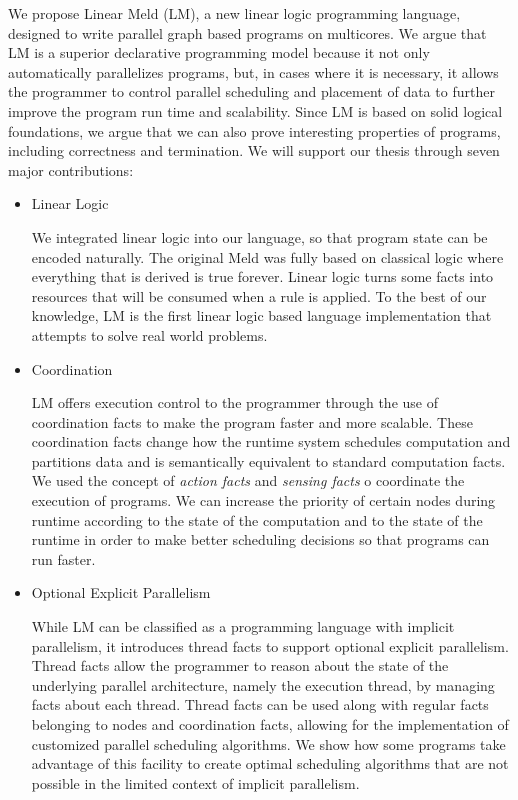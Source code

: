 
We propose Linear Meld (LM), a new linear logic programming language, designed
to write parallel graph based programs on multicores.  We argue that LM is a
superior declarative programming model because it not only automatically
parallelizes programs, but, in cases where it is necessary, it allows the
programmer to control parallel scheduling and placement of data to further
improve the program run time and scalability.  Since LM is based on solid
logical foundations, we argue that we can also prove interesting properties of
programs, including correctness and termination. We will support our thesis
through seven major contributions:

\begin{itemize}
   
   \item Linear Logic

   We integrated linear logic into our language, so that program state can be
   encoded naturally. The original Meld was fully based on classical logic where
   everything that is derived is true forever. Linear logic turns some facts
   into resources that will be consumed when a rule is applied.  To the best of
   our knowledge, LM is the first linear logic based language implementation
   that attempts to solve real world problems.


   \item Coordination
   
   LM offers execution control to the programmer through the use of coordination
   facts to make the program faster and more scalable. These coordination facts
   change how the runtime system schedules computation and partitions data and
   is semantically equivalent to standard computation facts.  We used the
   concept of \emph{action facts} and \emph{sensing facts} o coordinate the
   execution of programs.  We can increase the priority of certain nodes during
   runtime according to the state of the computation and to the state of the
   runtime in order to make better scheduling decisions so that programs can run
   faster.

   \item Optional Explicit Parallelism

   While LM can be classified as a programming language with implicit
   parallelism, it introduces thread facts to support optional explicit
   parallelism. Thread facts allow the programmer to reason about the state of
   the underlying parallel architecture, namely the execution thread, by
   managing facts about each thread. Thread facts can be used along with regular
   facts belonging to nodes and coordination facts, allowing for the
   implementation of customized parallel scheduling algorithms. We show how some
   programs take advantage of this facility to create optimal scheduling
   algorithms that are not possible in the limited context of implicit
   parallelism.
   

\end{itemize}
